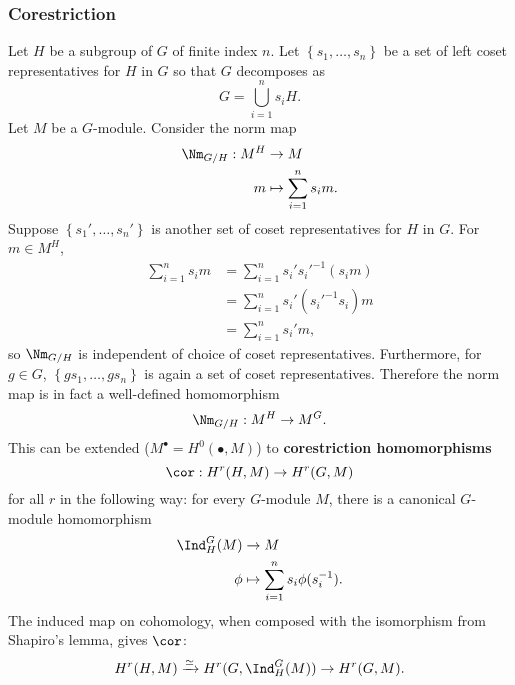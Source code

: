 \subsubsection{Corestriction}
Let $H$ be a subgroup of $G$ of finite index $n$. Let $\left\lbrace s_1,\dots, s_n\right\rbrace$ be a set of left coset representatives for $H$ in $G$ so that $G$ decomposes as
\[
	G=\bigcup\limits_{i=1}^{n}s_iH
.\] 
Let $M$ be a $G$-module. Consider the norm map  
\begin{align*}
	\Nm_{G/H}:M^{H}&\to M\\
	m&\mapsto\sum\limits_{i=1}^{n}s_im
.\end{align*}
Suppose $\left\lbrace s_1',\dots, s_n'\right\rbrace$ is another set of coset representatives for $H$ in $G$. For $m\in M^{H}$,
\begin{align*}
	\sum\limits_{i=1}^{n}s_im&=\sum\limits_{i=1}^{n}s_i's_i'^{-1}(s_im)\\
				 &=\sum\limits_{i=1}^{n}s_i'(s_i'^{-1}s_i)m\\
				 &=\sum\limits_{i=1}^{n}s_i'm
,\end{align*}
so $\Nm_{G/H}$ is independent of choice of coset representatives. Furthermore, for $g\in G$, $\left\lbrace gs_1,\dots, gs_n\right\rbrace$ is again a set of coset representatives. Therefore the norm map is in fact a well-defined homomorphism
\begin{align*}
	\Nm_{G/H}:M^{H}\to M^{G}
.\end{align*}
This can be extended ($M^{\bullet}=H^{0}(\bullet,M)$) to \textbf{corestriction homomorphisms}
\[
	\cor:H^{r}(H,M)\to H^{r}(G,M)
\] 
for all $r$ in the following way: for every $G$-module $M$, there is a canonical $G$-module homomorphism
\begin{align*}
	\Ind^{G}_H(M)&\to M\\
	\phi&\mapsto\sum\limits_{i=1}^{n}s_i\phi(s_i^{-1})
.\end{align*}
The induced map on cohomology, when composed with the isomorphism from Shapiro's lemma, gives $\cor$:
\[
	H^{r}(H,M)\xrightarrow{\simeq}H^{r}(G,\Ind^{G}_H(M))\to H^{r}(G,M)
.\] 
